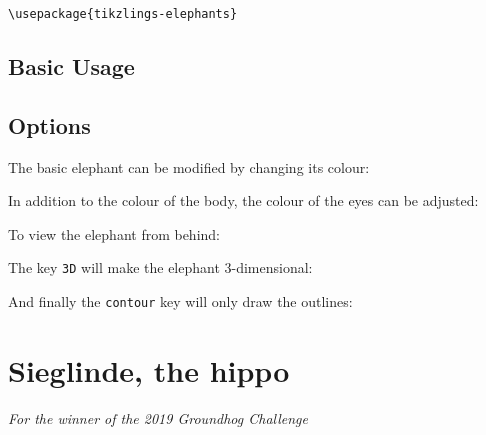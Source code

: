 \documentclass[parskip=half]{scrartcl}
\begin{document}
\begin{tcolorbox}[lower separated=false, lefthand width=.8\linewidth]
\vspace*{0.5cm}
\lstinline|\usepackage{tikzlings-elephants}| 
\vspace*{0.5cm}
\end{tcolorbox}

\subsection{Basic Usage}

\begin{tcblisting}{}
\elephant
\end{tcblisting}

\subsection{Options}

The basic elephant can be modified by changing its colour:
\begin{tcblisting}{}
\elephant[body=blue]
\end{tcblisting}

In addition to the colour of the body, the colour of the eyes can be adjusted:
\begin{tcblisting}{}
\elephant[eye=red]
\end{tcblisting}

To view the elephant from behind:
\begin{tcblisting}{}
\elephant[back]
\end{tcblisting}

The key \lstinline|3D| will make the elephant 3-dimensional:
\begin{tcblisting}{}
\elephant[3D]
\end{tcblisting}

And finally the \lstinline|contour| key will only draw the outlines:
\begin{tcblisting}{}
\elephant[contour=black]
\end{tcblisting}


%
%
\clearpage
\section[Hippo]{Sieglinde, the hippo}

\emph{For the winner of the 2019 Groundhog Challenge}
\end{document}
